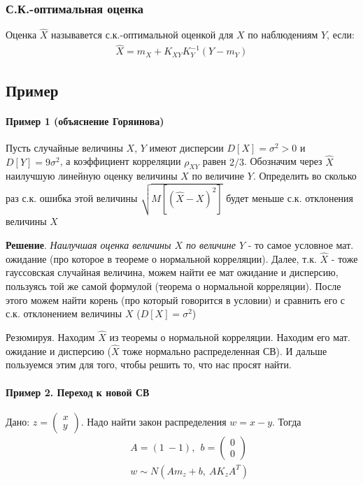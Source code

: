 \documentclass[12pt]{extarticle}
\begin{document}
\subsubsection{С.К.-оптимальная оценка}
Оценка $\hat{X}$ называвется с.к.-оптимальной оценкой для $X$ по
наблюдениям $Y$, если:
\begin{eqnarray*}
    \hat{X}=m_{X}+K_{XY}K_{Y}^{-1}(Y-m_{Y})
\end{eqnarray*}

\subsection{Пример}
\paragraph{Пример 1 (объяснение Горяинова)}
Пусть случайные величины $X$, $Y$ имеют дисперсии $D[X]=\sigma^{2}>0$ и
$D[Y]=9\sigma^{2}$, а коэффициент корреляции $\rho_{XY}$ равен $2/3$.
Обозначим через $\hat{X}$ наилучшую линейную оценку величины $X$ по
величине $Y$. Определить во сколько раз с.к. ошибка этой величины
$\sqrt{M[(\hat{X}-X)^{2}]}$ будет меньше с.к. отклонения величины $X$

\par\textbf{Решение}. \textit{Наилучшая оценка величины $X$ по величине $Y$} - то самое
условное мат. ожидание (про которое в теореме о нормальной корреляции).
Далее, т.к. $\hat{X}$ - тоже гауссовская случайная величина, можем найти
ее мат ожидание и дисперсию, пользуясь той же самой формулой (теорема о
нормальной корреляции). После этого можем найти корень (про который
говорится в условии) и сравнить его с с.к. отклонением величины $X$
($D[X]=\sigma^{2}$)

\par Резюмируя. Находим $\hat{X}$ из теоремы о нормальной корреляции.
Находим его мат. ожидание и дисперсию ($\hat{X}$ тоже нормально
распределенная СВ). И дальше пользуемся этим для того, чтобы решить то,
что нас просят найти.

\paragraph{Пример 2. Переход к новой СВ}
Дано: $z=\left(\begin{array}{c}x\\y \end{array} \right)$. Надо найти
закон распределения $w = x - y$. Тогда
\begin{eqnarray*}
    &&A=(1\ -1)
    ,\ \ b=\left(\begin{array}{c} 0\\0 \end{array} \right)\\
    &&w\sim N(Am_{z}+b,\ AK_{z}A^{T})
\end{eqnarray*}
\end{document}
